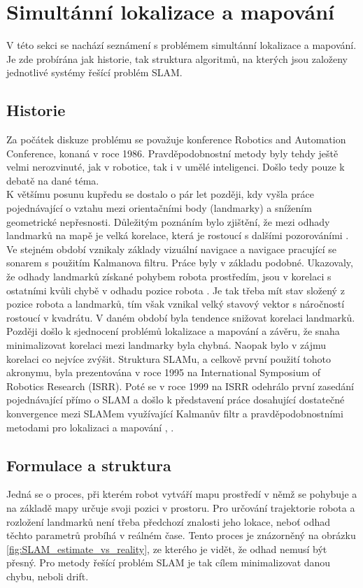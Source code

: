 \documentclass[12pt]{report}
\begin{document}
\chapter{Simultánní lokalizace a mapování}

V této sekci se nachází seznámení s problémem simultánní lokalizace a mapování. Je zde probírána jak historie, tak struktura algoritmů, na kterých jsou založeny jednotlivé systémy řešící problém SLAM. 

\section{Historie}
Za počátek diskuze problému se považuje konference Robotics and Automation Conference, konaná v roce 1986. Pravděpodobnostní metody byly tehdy ještě velmi nerozvinuté, jak v robotice, tak i v umělé inteligenci. Došlo tedy pouze k debatě na dané téma.\\
\indent K většímu posunu kupředu se dostalo o pár let později, kdy vyšla práce pojednávající o vztahu mezi orientačními body (landmarky) a snížením geometrické nepřesnosti. Důležitým poznáním bylo zjištění, že mezi odhady landmarků na mapě je velká korelace, která je rostoucí s dalšími pozorováními \cite{Durrant-Whyte1988}.\\
\indent Ve stejném období vznikaly základy vizuální navigace a navigace pracující se sonarem s použitím Kalmanova filtru. Práce byly v základu podobné. Ukazovaly, že odhady landmarků získané pohybem robota prostředím, jsou v korelaci s ostatními kvůli chybě v odhadu pozice robota \cite{Leonarda}. Je tak třeba mít stav složený z pozice robota a landmarků, tím však vznikal velký stavový vektor s náročností rostoucí v kvadrátu. V daném období byla tendence snižovat korelaci landmarků.\\
\indent Později došlo k sjednocení problémů lokalizace a mapování a závěru, že snaha minimalizovat korelaci mezi landmarky byla chybná. Naopak bylo v zájmu korelaci co nejvíce zvýšit. Struktura SLAMu, a celkově první použití tohoto akronymu, byla prezentována v roce 1995 na International Symposium of Robotics Research (ISRR). Poté se v roce 1999 na ISRR odehrálo první zasedání pojednávající přímo o SLAM a došlo k představení práce dosahující dostatečné konvergence mezi SLAMem využívající Kalmanův filtr a pravděpodobnostními metodami pro lokalizaci a mapování \cite{2000}, \cite{Thrun1998}.


\section{Formulace a struktura} 
Jedná se o proces, při kterém robot vytváří mapu prostředí v němž se pohybuje a na základě mapy určuje svoji pozici v prostoru. Pro určování trajektorie robota a rozložení landmarků není třeba předchozí znalosti jeho lokace, neboť odhad těchto parametrů probíhá v reálném čase. Tento proces je znázorněný na obrázku \ref{fig:SLAM_estimate_vs_reality}, ze kterého je vidět, že odhad nemusí být přesný. Pro metody řešící problém SLAM je tak cílem minimalizovat danou chybu, neboli drift.
\end{document}
